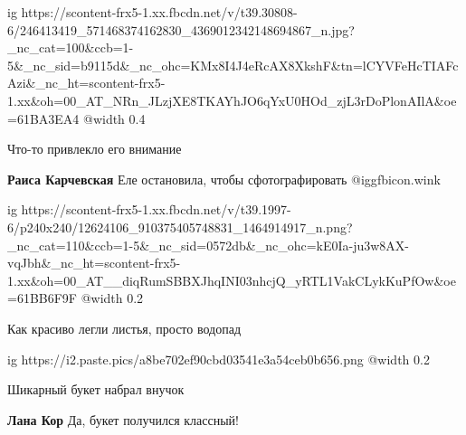  
 
 
 
 

\ifcmt
  ig https://scontent-frx5-1.xx.fbcdn.net/v/t39.30808-6/246413419_571468374162830_4369012342148694867_n.jpg?_nc_cat=100&ccb=1-5&_nc_sid=b9115d&_nc_ohc=KMx8I4J4eRcAX8XkshF&tn=lCYVFeHcTIAFcAzi&_nc_ht=scontent-frx5-1.xx&oh=00_AT_NRn_JLzjXE8TKAYhJO6qYxU0HOd_zjL3rDoPlonAIlA&oe=61BA3EA4
  @width 0.4
\fi


Что-то привлекло его внимание

\textbf{Раиса Карчевская} Еле остановила, чтобы сфотографировать @igg{fbicon.wink} 


\ifcmt
  ig https://scontent-frx5-1.xx.fbcdn.net/v/t39.1997-6/p240x240/12624106_910375405748831_1464914917_n.png?_nc_cat=110&ccb=1-5&_nc_sid=0572db&_nc_ohc=kE0Ia-ju3w8AX-vqJbh&_nc_ht=scontent-frx5-1.xx&oh=00_AT__diqRumSBBXJhqINI03nhcjQ_yRTL1VakCLykKuPfOw&oe=61BB6F9F
  @width 0.2
\fi

Как красиво легли листья, просто водопад


\ifcmt
  ig https://i2.paste.pics/a8be702ef90cbd03541e3a54ceb0b656.png
  @width 0.2
\fi

Шикарный букет набрал внучок

\textbf{Лана Кор} Да, букет получился классный!
